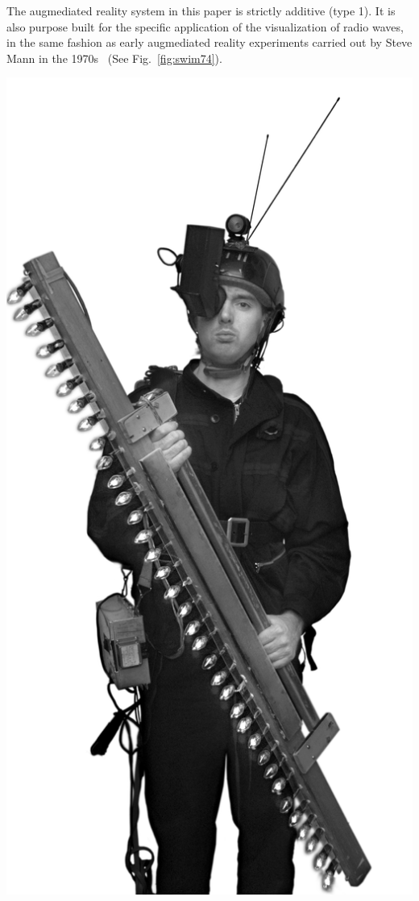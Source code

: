 \documentclass{sigchi-ext}
\begin{document}
The augmediated reality system in this paper is strictly additive (type 1). It
is also purpose built for the specific application of the visualization of
radio waves, in the same fashion as early augmediated reality experiments
carried out by Steve Mann in the 1970s~\cite{mann2015phenomenal}
(See Fig.~\ref{fig:swim74}).
\begin{marginfigure}[-25pc]
  \begin{minipage}{\marginparwidth}
 \includegraphics[width=\textwidth]{SteveMann_SequentialWaveImprintingMachine_AR_wand_6502-44_nan_crop.png}

\end{minipage}
\end{marginfigure}
\end{document}
